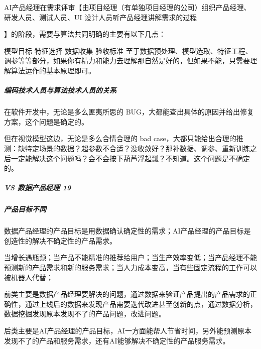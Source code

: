\documentclass[letterpaper,11pt,english]{sphinxmanual}
\begin{document}
AI产品经理在需求评审【由项目经理（有单独项目经理的公司）组织产品经理、研发人员、测试人员、UI
设计人员听产品经理讲解需求的过程%
\begin{footnote}[91]\sphinxAtStartFootnote
{}
%
\end{footnote}】的阶段，需要与算法共同明确的主要有以下几点：%
\begin{footnote}[92]\sphinxAtStartFootnote
{}
%
\end{footnote}

模型目标 特征选择 数据收集 验收标准
至于数据预处理、模型选取、特征工程、调参等等部分，如果你有精力和能力去理解那自然是好的，但如果不能，只需要理解算法运作的基本原理即可。


\subparagraph{编码技术人员与算法技术人员的关系}
\label{\detokenize{chapter_introduction/AI_PM:id12}}
在软件开发中，无论是多么匪夷所思的
BUG，大都能查出具体的原因并给出修复方案，这个问题是确定的。

但在视觉模型这边，无论是多么合情合理的 bad
case，大都只能给出合理的推测：缺特定场景的数据？超参数不合适？没收敛好？那补数据、调参、重新训练之后一定能解决这个问题吗？会不会按下葫芦浮起瓢？不知道。这个问题是不确定的。


\subparagraph{VS 数据产品经理 19\sphinxfootnotemark[93]}
\label{\detokenize{chapter_introduction/AI_PM:vs-19}}%
\begin{footnotetext}[93]\sphinxAtStartFootnote
{}
%
\end{footnotetext}\ignorespaces 

\subparagraph{产品目标不同}
\label{\detokenize{chapter_introduction/AI_PM:id13}}
数据产品经理的产品目标是用数据确认确定性的需求；AI产品经理的产品目标是创造性的解决不确定性的产品需求。

当增长遇瓶颈；当产品不能精准的推荐给用户；当生产效率变低；当产品经理不能预测新的产品需求和新的服务需求；当人力成本变高，当有些固定流程的工作可以被机器人代替；

前类主要是数据产品经理要解决的问题，通过数据来验证产品提出的产品需求的正确性，通过上线后的数据来发现产品需要迭代改进甚至创新的点，通过数据分析，数据挖掘发现原本发现不了的产品问题，改进问题。

后类主要是AI产品经理的产品目标，AI一方面能帮人节省时间，另外能预测原本发现不了的产品和服务需求，还有AI能够解决不确定性的产品服务需求。
\end{document}
